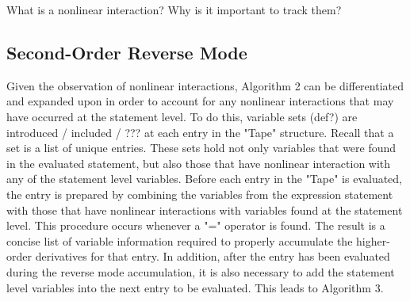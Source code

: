 \documentclass[oneside]{article}
\begin{document}
\begin{editnote}
What is a nonlinear interaction?
Why is it important to track them?
\end{editnote}

\subsection{Second-Order Reverse Mode}
Given the observation of nonlinear interactions, Algorithm 2 can be differentiated and expanded upon in order to account for any nonlinear interactions that may have occurred at the statement level. To do this, variable sets (def?) are introduced / included / ??? at each entry in the "Tape" structure. Recall that a set is a list of unique entries. These sets hold not only variables that were found in the evaluated statement, but also those that have nonlinear interaction with any of the statement level variables. Before each entry in the "Tape" is evaluated, the entry is prepared by combining the variables from the expression statement with those that have nonlinear interactions with variables found at the statement level. This procedure occurs whenever a "=" operator is found.  The result is a concise list of variable information required to properly accumulate the higher-order derivatives for that entry. In addition, after the entry has been evaluated during the reverse mode accumulation, it is also necessary to add the statement level variables into the next entry to be evaluated. This leads to Algorithm 3. \\
\newpage
\end{document}
